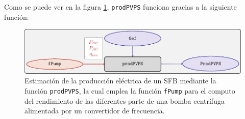 Como se puede ver en la figura \ref{fig:prodpvps}, \texttt{prodPVPS} funciona gracias a la siguiente función:
\begin{figure}[htbp]
\centering
\includegraphics[keepaspectratio,width=\textwidth,height=0.5\textheight]{figuras/prodpvps.pdf}
\caption{Estimación de la producción eléctrica de un SFB mediante la función \texttt{prodPVPS}, la cual emplea la función \texttt{fPump} para el computo del rendimiento de las diferentes parte de una bomba centrífuga alimentada por un convertidor de frecuencia. \label{fig:prodpvps}}
\end{figure}
